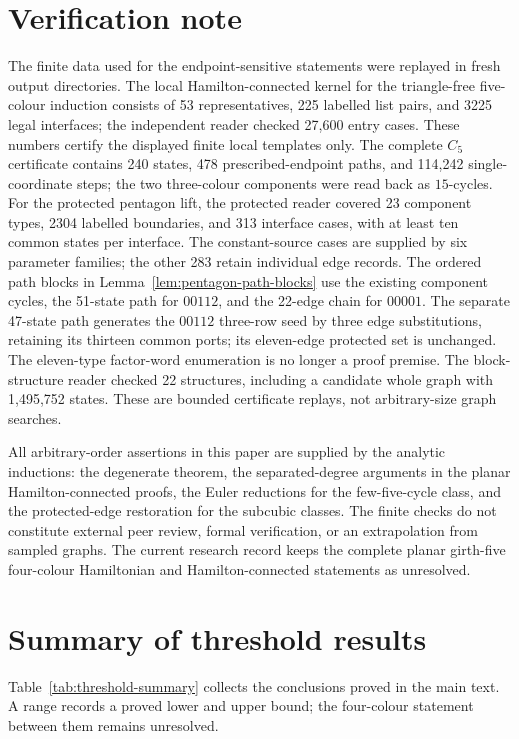 \documentclass[11pt]{article}
\theoremstyle{remark}
\numberwithin{equation}{section}
\numberwithin{table}{section}
\begin{document}
\section{Verification note}
\label{sec:verification}

The finite data used for the endpoint-sensitive statements were replayed in fresh output directories.  The local Hamilton-connected kernel for the triangle-free five-colour induction consists of 53 representatives, 225 labelled list pairs, and 3225 legal interfaces; the independent reader checked 27,600 entry cases.  These numbers certify the displayed finite local templates only.  The complete $C_5$ certificate contains 240 states, 478 prescribed-endpoint paths, and 114,242 single-coordinate steps; the two three-colour components were read back as $15$-cycles.  For the protected pentagon lift, the protected reader covered 23 component types, 2304 labelled boundaries, and 313 interface cases, with at least ten common states per interface. The constant-source cases are supplied by six parameter families; the other 283 retain individual edge records. The ordered path blocks in Lemma~\ref{lem:pentagon-path-blocks} use the existing component cycles, the 51-state path for $00112$, and the 22-edge chain for $00001$. The separate 47-state path generates the $00112$ three-row seed by three edge substitutions, retaining its thirteen common ports; its eleven-edge protected set is unchanged. The eleven-type factor-word enumeration is no longer a proof premise.  The block-structure reader checked 22 structures, including a candidate whole graph with 1,495,752 states.  These are bounded certificate replays, not arbitrary-size graph searches.

All arbitrary-order assertions in this paper are supplied by the analytic inductions: the degenerate theorem, the separated-degree arguments in the planar Hamilton-connected proofs, the Euler reductions for the few-five-cycle class, and the protected-edge restoration for the subcubic classes.  The finite checks do not constitute external peer review, formal verification, or an extrapolation from sampled graphs.  The current research record keeps the complete planar girth-five four-colour Hamiltonian and Hamilton-connected statements as unresolved.

\clearpage
\appendix
\section{Summary of threshold results}
\label{app:threshold-summary}
Table~\ref{tab:threshold-summary} collects the conclusions proved in the
main text. A range records a proved lower and upper bound; the
four-colour statement between them remains unresolved.
\end{document}
